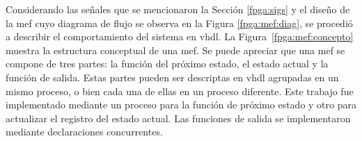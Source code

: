 Considerando las señales que se mencionaron la Sección \ref{fpga:sigs} y el diseño de la \acrshort{mef} cuyo diagrama de flujo se observa en la Figura \ref{fpga:mef:diag}, se procedió a describir el comportamiento del sistema en \acrshort{vhdl}. La Figura~\ref{fpga:mef:concepto} muestra la estructura conceptual de una \acrshort{mef}. Se puede apreciar que una \acrshort{mef} se compone de tres partes: la función del próximo estado, el estado actual y la función de salida. Estas partes pueden ser descriptas en \acrshort{vhdl} agrupadas en un mismo proceso, o bien cada una de ellas en un proceso diferente. Este trabajo fue implementado mediante un proceso para la función de próximo estado y otro para actualizar el registro del estado actual. Las funciones de salida se implementaron mediante declaraciones concurrentes.

%
%

